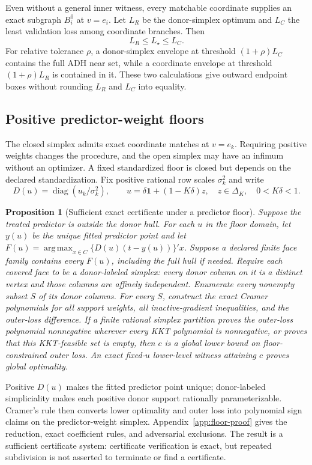 \documentclass[10pt]{article}
\newtheorem{proposition}[theorem]{Proposition}
\theoremstyle{definition}
\newcommand{\DeltaK}{\Delta_K}
\newcommand{\argmax}{\operatorname*{arg\,max}}
\newcommand{\ones}{\mathbf 1}
\begin{document}
Even without a general inner witness, every matchable coordinate supplies an
exact subgraph $B_i^0$ at $v=e_i$.  Let $L_R$ be the donor-simplex optimum and
$L_C$ the least validation loss among coordinate branches.  Then
\[
 L_R\le L_\star\le L_C. \tag{2}
\]
For relative tolerance $\rho$, a donor-simplex envelope at threshold
$(1+\rho)L_C$ contains the full ADH near set, while a coordinate envelope at
threshold $(1+\rho)L_R$ is contained in it.  These two calculations give
outward endpoint boxes without rounding $L_R$ and $L_C$ into equality.

\subsection{Positive predictor-weight floors}

The closed simplex admits exact coordinate matches at $v=e_k$.  Requiring
positive weights changes the procedure, and the open simplex may have an
infimum without an optimizer.  A fixed standardized floor is closed but
depends on the declared standardization.  Fix positive rational row scales
$\sigma_k^2$ and write
\[
 D(u)=\operatorname{diag}(u_k/\sigma_k^2),\qquad
 u=\delta\ones+(1-K\delta)z,\quad z\in\DeltaK,\quad 0<K\delta<1.
\]

\begin{proposition}[Sufficient exact certificate under a predictor floor]
\label{prop:floor}
Suppose the treated predictor is outside the donor hull.  For each $u$ in the
floor domain, let $y(u)$ be the unique fitted predictor point and let
$F(u)=\argmax_{x\in C}\{D(u)(t-y(u))\}'x$.  Suppose a declared finite face
family contains every $F(u)$, including the full hull if needed.  Require each
covered face to be a \emph{donor-labeled simplex}: every donor column on it is
a distinct vertex and those columns are affinely independent.  Enumerate every
nonempty subset $S$ of its donor columns.  For every $S$, construct the exact
Cramer polynomials for all support weights, all inactive-gradient inequalities,
and the outer-loss difference.  If a finite rational simplex partition proves
the outer-loss polynomial nonnegative wherever every KKT polynomial is
nonnegative, or proves that this KKT-feasible set is empty, then $c$ is a global
lower bound on floor-constrained outer loss.  An exact fixed-$u$ lower-level
witness attaining $c$ proves global optimality.
\end{proposition}

Positive $D(u)$ makes the fitted predictor point unique; donor-labeled
simpliciality makes each positive donor support rationally parameterizable.
Cramer's rule then converts lower optimality and outer loss into polynomial
sign claims on the predictor-weight simplex.  Appendix~\ref{app:floor-proof}
gives the reduction, exact coefficient rules, and adversarial exclusions.  The
result is a sufficient certificate system: certificate verification is exact,
but repeated subdivision is not asserted to terminate or find a certificate.
\end{document}
